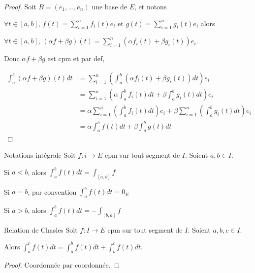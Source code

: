 
\begin{proof}
    Soit $B = (e_1, \ldots, e_n)$ une base de $E$, et notons 
    
    $\displaystyle \forall t \in [a, b], \, f(t) = \sum_{i=1}^n f_i(t)e_i$ et
    $\displaystyle g(t) = \sum_{i=1}^n g_i(t)e_i$ alors 

    $\displaystyle \forall t \in [a, b], \, (\alpha f + \beta g)(t) = \sum_{i=1}^n (\alpha f_i(t) + \beta g_i(t))e_i$.

    Donc $\alpha f + \beta g$ est cpm et par def,

    \begin{align*}
        \int_a^b (\alpha f + \beta g)(t) dt & = \sum_{i=1}^n \left( \int_a^b (\alpha f_i(t) + \beta g_i(t)) dt \right) e_i\\
        & = \sum_{i=1}^n \left( \alpha \int_a^b f_i(t) dt + \beta \int_a^b g_i(t) dt \right) e_i\\
        & = \alpha \sum_{i=1}^n \left( \int_a^b f_i(t) dt \right) e_i + \beta \sum_{i=1}^n \left( \int_a^b g_i(t) dt \right) e_i\\
        & = \alpha \int_a^b f(t) dt + \beta \int_a^b g(t) dt
    \end{align*}
\end{proof}


\begin{proposition}{Notations intégrale}{}
    Soit $f : i \to E$ cpm sur tout segment de $I$. Soient $a, b \in I$.

    Si $a < b$, alors $\displaystyle \int_a^b f(t) dt = \int_{[a, b]} f$

    Si $a = b$, par convention $\displaystyle \int_a^b f(t) dt = 0_E$

    Si $a > b$, alors $\displaystyle \int_a^b f(t) dt = - \int_{[b, a]} f$
    
\end{proposition}


\begin{proposition}{Relation de Chasles}{}
    Soit $f : I \to E$ cpm sur tout segment de $I$. Soient $a, b, c \in I$.

    Alors $\displaystyle \int_a^c f(t) dt = \int_a^b f(t) dt + \int_b^c f(t) dt$.
    
\end{proposition}

\begin{proof}
    Coordonnée par coordonnée.
\end{proof}


